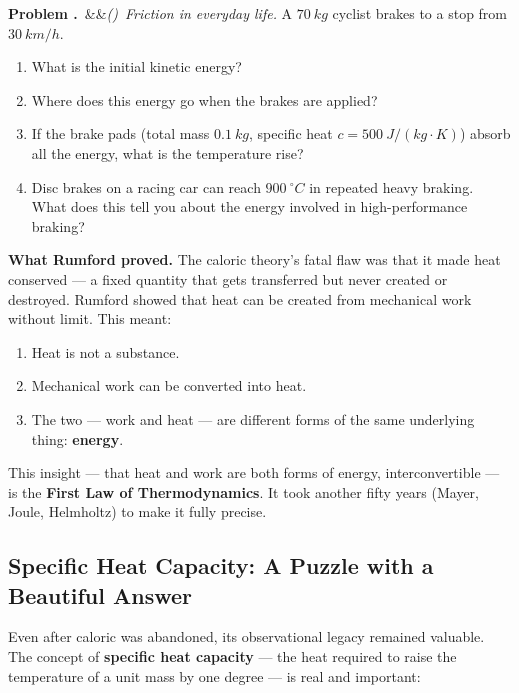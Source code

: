 \documentclass[12pt, a4paper, twoside]{book}
\newcounter{problem}[chapter]
\newcommand{\problem}[1][]{\refstepcounter{problem}\medskip\noindent
  \textcolor{accent}{\textbf{Problem \theproblem.}}\ \ifx&#1&\else\textit{(#1)}\ \fi}
\begin{document}
\begin{explobox}
\problem \textit{Friction in everyday life.} A $\SI{70}{kg}$ cyclist brakes to a stop from $\SI{30}{km/h}$.
\begin{enumerate}[label=(\alph*)]
  \item What is the initial kinetic energy?
  \item Where does this energy go when the brakes are applied?
  \item If the brake pads (total mass $\SI{0.1}{kg}$, specific heat $c = \SI{500}{J/(kg\cdot K)}$) absorb all the energy, what is the temperature rise?
  \item Disc brakes on a racing car can reach $\SI{900}{^\circ C}$ in repeated heavy braking. What does this tell you about the energy involved in high-performance braking?
\end{enumerate}
\end{explobox}

\begin{discoverybox}
\textbf{What Rumford proved.} The caloric theory's fatal flaw was that it made heat conserved --- a fixed quantity that gets transferred but never created or destroyed. Rumford showed that heat can be created from mechanical work without limit. This meant:

\begin{enumerate}[leftmargin=2em,itemsep=3pt]
  \item Heat is not a substance.
  \item Mechanical work can be converted into heat.
  \item The two --- work and heat --- are different forms of the same underlying thing: \textbf{energy}.
\end{enumerate}

This insight --- that heat and work are both forms of energy, interconvertible --- is the \textbf{First Law of Thermodynamics}. It took another fifty years (Mayer, Joule, Helmholtz) to make it fully precise.
\end{discoverybox}

\subsection{Specific Heat Capacity: A Puzzle with a Beautiful Answer}

Even after caloric was abandoned, its observational legacy remained valuable. The concept of \textbf{specific heat capacity} --- the heat required to raise the temperature of a unit mass by one degree --- is real and important:
\end{document}
